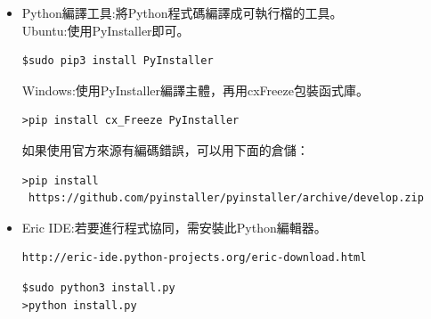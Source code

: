 \documentclass[14pt,a4paper]{report}  %
\begin{document}
{     \begin{itemize}
		\item Python編譯工具:將Python程式碼編譯成可執行檔的工具。
		\hspace*{\fill} \\
		Ubuntu:使用PyInstaller即可。
		\begin{lstlisting}[caption=安裝PyInstaller]
$sudo pip3 install PyInstaller
		\end{lstlisting}
		Windows:使用PyInstaller編譯主體，再用cxFreeze包裝函式庫。\\
		\begin{lstlisting}[caption=安裝cxFreeze]
>pip install cx_Freeze PyInstaller
		\end{lstlisting}
		如果使用官方來源有編碼錯誤，可以用下面的倉儲：
		\begin{lstlisting}[caption=下載倉儲]
>pip install
 https://github.com/pyinstaller/pyinstaller/archive/develop.zip
		\end{lstlisting}
		\end{itemize} 
		
	\begin{itemize}
		\item Eric IDE:若要進行程式協同，需安裝此Python編輯器。
		\begin{lstlisting}[caption=下載Eric IDE]
http://eric-ide.python-projects.org/eric-download.html
		\end{lstlisting}
		\begin{lstlisting}[caption=執行install.py]
$sudo python3 install.py
>python install.py
		\end{lstlisting}
		\end{itemize}
		
}
\end{document}
